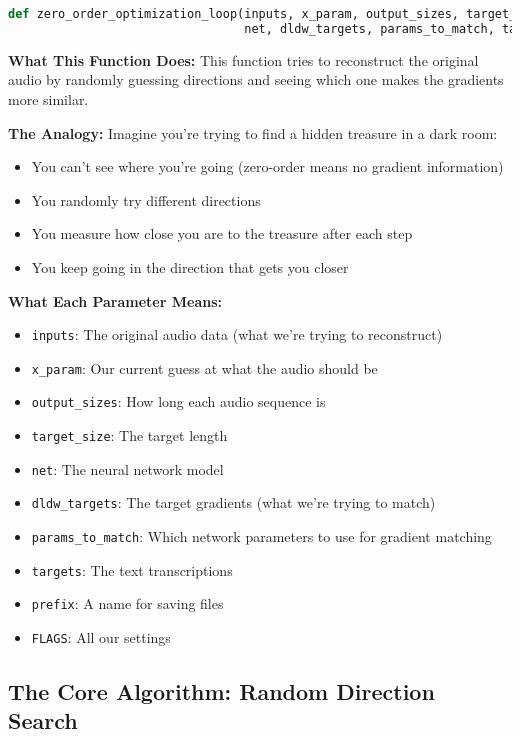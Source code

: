 \documentclass[12pt]{article}
\begin{document}
\begin{lstlisting}[language=Python, basicstyle=\small]
def zero_order_optimization_loop(inputs, x_param, output_sizes, target_size,
                                 net, dldw_targets, params_to_match, targets, prefix, FLAGS):
\end{lstlisting}

\textbf{What This Function Does:}
This function tries to reconstruct the original audio by randomly guessing directions and seeing which one makes the gradients more similar.

\textbf{The Analogy:}
Imagine you're trying to find a hidden treasure in a dark room:
\begin{itemize}
    \item You can't see where you're going (zero-order means no gradient information)
    \item You randomly try different directions
    \item You measure how close you are to the treasure after each step
    \item You keep going in the direction that gets you closer
\end{itemize}

\textbf{What Each Parameter Means:}
\begin{itemize}
    \item \texttt{inputs}: The original audio data (what we're trying to reconstruct)
    \item \texttt{x\_param}: Our current guess at what the audio should be
    \item \texttt{output\_sizes}: How long each audio sequence is
    \item \texttt{target\_size}: The target length
    \item \texttt{net}: The neural network model
    \item \texttt{dldw\_targets}: The target gradients (what we're trying to match)
    \item \texttt{params\_to\_match}: Which network parameters to use for gradient matching
    \item \texttt{targets}: The text transcriptions
    \item \texttt{prefix}: A name for saving files
    \item \texttt{FLAGS}: All our settings
\end{itemize}

\subsection{The Core Algorithm: Random Direction Search}
\end{document}
